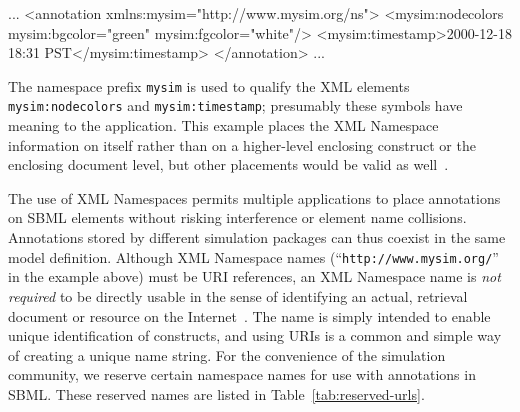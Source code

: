 \documentclass[10pt,twocolumntoc]{cekarticle}
\begin{document}
\begin{example}
...
<annotation xmlns:mysim="http://www.mysim.org/ns">
    <mysim:nodecolors mysim:bgcolor="green" mysim:fgcolor="white"/>
    <mysim:timestamp>2000-12-18 18:31 PST</mysim:timestamp>
</annotation>
...
\end{example}

The namespace prefix \texttt{mysim} is used to qualify the XML elements
\texttt{mysim:nodecolors} and \texttt{mysim:timestamp}; presumably these
symbols have meaning to the application.  This example places the XML
Namespace information on  itself rather than on a
higher-level enclosing construct or the enclosing document level, but other
placements would be valid as well~\citep{bray:1999}.

The use of XML Namespaces permits multiple applications to place
annotations on SBML elements without risking interference or element name
collisions.  Annotations stored by different simulation packages can thus
coexist in the same model definition.  Although XML Namespace names
(``\texttt{http://www.mysim.org/}'' in the example above) must be URI
references, an XML Namespace name is \emph{not required} to be directly
usable in the sense of identifying an actual, retrieval document or
resource on the Internet~\citep{bray:1999}.  The name is simply intended to
enable unique identification of constructs, and using URIs is a common and
simple way of creating a unique name string.  For the convenience of the
simulation community, we reserve certain namespace names for use with
annotations in SBML.  These reserved names are listed in
Table~\ref{tab:reserved-urls}.
\end{document}

